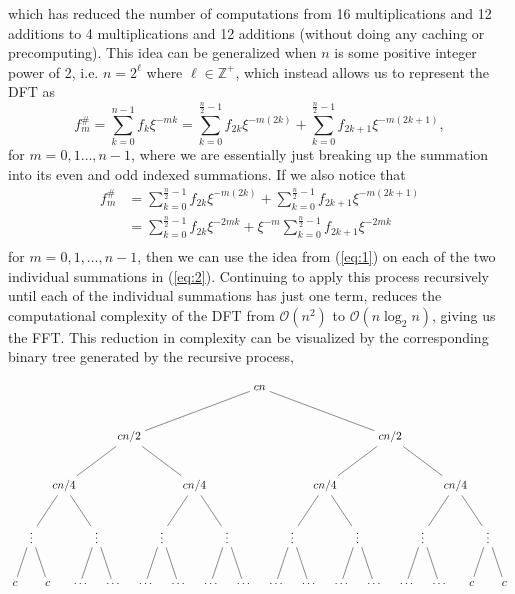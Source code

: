\documentclass[11pt]{article}
\begin{document}
which has reduced the number of computations from 16 multiplications and 12 additions to 4 multiplications
and 12 additions (without doing any caching or precomputing).
This idea can be generalized when $n$ is some positive integer power of 2,
i.e. $n = 2^{\ell}$ where $\ell \in \mathbb{Z}^+$, which instead allows us to represent the DFT as
\begin{equation}
	\label{eq:1}
	f_{m}^{\#} = \sum_{k=0}^{n-1}{f_k\xi^{-mk}} = \sum_{k=0}^{\frac{n}{2}-1}{f_{2k}\xi^{-m(2k)}} + \sum_{k=0}^{\frac{n}{2}-1}{f_{2k + 1}\xi^{-m(2k+1)}},
\end{equation}
for $m = 0,1\dots,n-1$, where we are essentially just breaking up the summation into its even and odd indexed
summations. If we also notice that
\begin{equation}
	\begin{aligned}
		f_{m}^{\#} &= \sum_{k=0}^{\frac{n}{2}-1}{f_{2k}\xi^{-m(2k)}} + \sum_{k=0}^{\frac{n}{2}-1}{f_{2k + 1}\xi^{-m(2k+1)}} \\
		&= \sum_{k=0}^{\frac{n}{2}-1}{f_{2k}\xi^{-2mk}} + \xi^{-m}\sum_{k=0}^{\frac{n}{2}-1}{f_{2k + 1}\xi^{-2mk}} \\
	\end{aligned}
	\label{eq:2}
\end{equation}
for $m = 0,1,\dots,n-1$, then we can use the idea from (\ref{eq:1}) on each of the two individual summations in (\ref{eq:2}).
Continuing to apply this process recursively until each of the individual summations has just one term,
reduces the computational complexity of the DFT from
$\mathcal{O}(n^2)$ to $\mathcal{O}(n\log_2{n})$, giving us the FFT.
This reduction in complexity can be visualized by the corresponding binary tree generated by the recursive process,

\[
\begin{tikzpicture}[level distance=1.5cm,
  level 1/.style={sibling distance=8cm},
  level 2/.style={sibling distance=4cm},
  level 3/.style={sibling distance=2cm},
  level 4/.style={sibling distance=1cm}]

  \node {$cn$}
    child {node {$cn/2$}
      child {node {$cn/4$}
        child {node {$\vdots$}
          child {node {$c$}}
          child {node {$c$}}
        }
        child {node {$\vdots$}
          child {node {$\ldots$}}
          child {node {$\ldots$}}
        }
      }
      child {node {$cn/4$}
        child {node {$\vdots$}
          child {node {$\ldots$}}
          child {node {$\ldots$}}
        }
        child {node {$\vdots$}
          child {node {$\ldots$}}
          child {node {$\ldots$}}
        }
      }
    }
    child {node {$cn/2$}
      child {node {$cn/4$}
        child {node {$\vdots$}
          child {node {$\ldots$}}
          child {node {$\ldots$}}
        }
        child {node {$\vdots$}
          child {node {$\ldots$}}
          child {node {$\ldots$}}
        }
      }
      child {node {$cn/4$}
        child {node {$\vdots$}
          child {node {$\ldots$}}
          child {node {$\ldots$}}
        }
        child {node {$\vdots$}
          child {node {$c$}}
          child {node {$c$}}
        }
      }
    };
\end{tikzpicture}
\]
\end{document}
